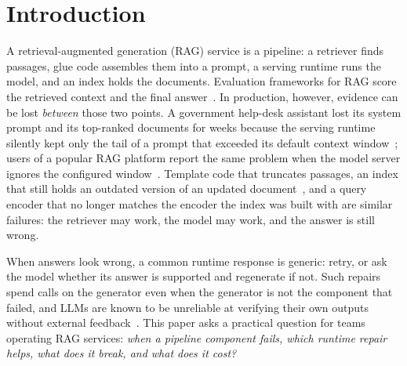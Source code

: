 \section{Introduction}

A retrieval-augmented generation (RAG) service is a pipeline: a retriever finds passages, glue code
assembles them into a prompt, a serving runtime runs the model, and an index holds the documents.
Evaluation frameworks for RAG score the retrieved context and the final
answer~\cite{es2024ragas,saadfalcon2024ares,ru2024ragchecker}. In production, however, evidence can
be lost \emph{between} those two points. A government help-desk assistant lost its system prompt and
its top-ranked documents for weeks because the serving runtime silently kept only the tail of a
prompt that exceeded its default context window~\cite{musetoiu2026ragal}; users of a popular RAG
platform report the same problem when the model server ignores the configured
window~\cite{ragflow_ollama_ctx}. Template code that truncates passages, an index that still holds
an outdated version of an updated document~\cite{ouyang2025hoh}, and a query encoder that no longer
matches the encoder the index was built with are similar failures: the retriever may work, the model
may work, and the answer is still wrong.

When answers look wrong, a common runtime response is generic: retry, or ask the model whether its
answer is supported and regenerate if not. Such repairs spend calls on the generator even when the
generator is not the component that failed, and LLMs are known to be unreliable at verifying their
own outputs without external feedback~\cite{huang2024selfcorrect}. This paper asks a practical
question for teams operating RAG services: \emph{when a pipeline component fails, which runtime
repair helps, what does it break, and what does it cost?}

